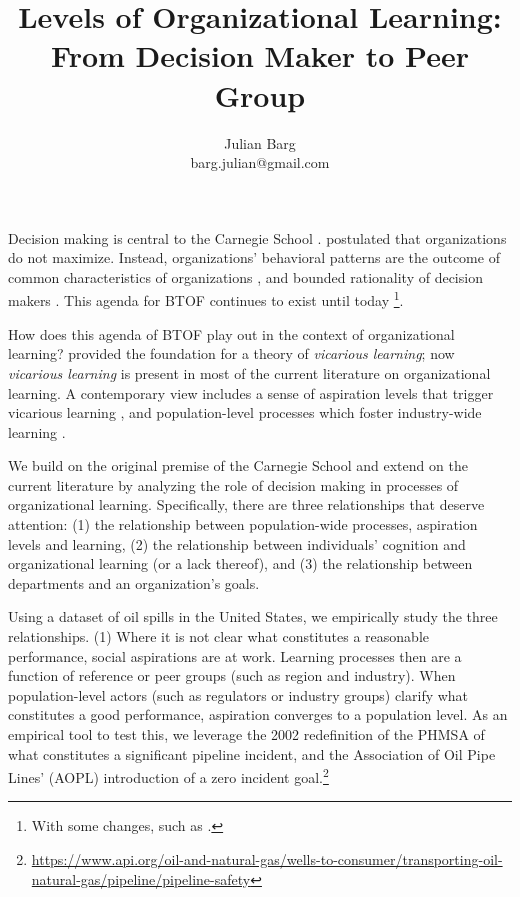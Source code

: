 \documentclass[12pt, man, natbib]{apa6}
\title{Levels of Organizational Learning: From Decision Maker to Peer Group}
\author{Julian Barg\\barg.julian@gmail.com}
\affiliation{Ivey Business School}
\begin{document}
\maketitle

\singlespacing

\section{}	
	Decision making is central to the Carnegie School \citep{Gavetti2012}. \citet{Cyert1963} postulated that organizations do not maximize. Instead, organizations' behavioral patterns are the outcome of common characteristics of organizations \citep[e.g., the existence of routines or performance programs, see][]{March1958}, and bounded rationality of decision makers \citep{Gavetti2012}. This agenda for BTOF continues to exist until today \footnote{With some changes, such as \citet{Levitt1988}.}.
	
	How does this agenda of BTOF play out in the context of organizational learning? \citet{Levitt1988} provided the foundation for a theory of \textit{vicarious learning}; now \textit{vicarious learning} is present in most of the current literature on organizational learning. A contemporary view includes a sense of aspiration levels that trigger vicarious learning \citep{Baum2007}, and population-level processes which foster industry-wide learning \citep{Madsen2018}.
	
	We build on the original premise of the Carnegie School and extend on the current literature by analyzing the role of decision making in processes of organizational learning. Specifically, there are three relationships that deserve attention: (1) the relationship between population-wide processes, aspiration levels and learning, (2) the relationship between individuals' cognition and organizational learning (or a lack thereof), and (3) the relationship between departments and an organization's goals.
	
	Using a dataset of oil spills in the United States, we empirically study the three relationships. (1) Where it is not clear what constitutes a reasonable performance, social aspirations are at work. Learning processes then are a function of reference or peer groups (such as region and industry). When population-level actors (such as regulators or industry groups) clarify what constitutes a good performance, aspiration converges to a population level. As an empirical tool to test this, we leverage the 2002 redefinition of the PHMSA of what constitutes a significant pipeline incident, and the Association of Oil Pipe Lines' (AOPL) introduction of a zero incident goal.\footnote{\url{https://www.api.org/oil-and-natural-gas/wells-to-consumer/transporting-oil-natural-gas/pipeline/pipeline-safety}}
	
\end{document}
